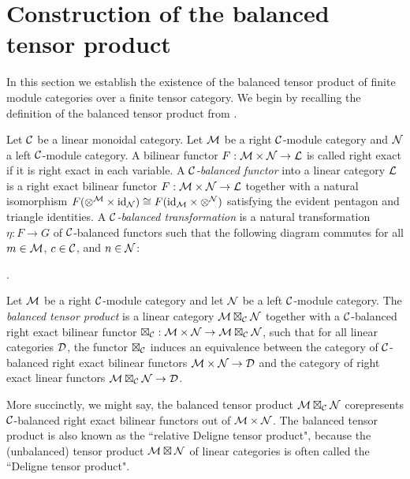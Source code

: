 \documentclass{amsart}
\begin{document}
\section{Construction of the balanced tensor product} \label{sec:tc-deligne}

In this section we establish the existence of the balanced tensor product of finite module categories over a finite tensor category.  We begin by recalling the definition of the balanced tensor product from \cite{0909.3140}.

\begin{definition} 
	Let $\mathcal C$ be a linear monoidal category. 
	Let $\mathcal M$ be a right $\mathcal C$-module category and $\mathcal N$ a left $\mathcal C$-module category.  A bilinear functor $F: \mathcal M \times \mathcal N \to \mathcal L$ is called right exact if it is right exact in each variable.   A {\em $\mathcal C$-balanced functor} into a linear category $\mathcal L$ is a right exact bilinear functor $F: \mathcal M \times \mathcal N \to \mathcal L$ together with a natural isomorphism $F(\otimes^{\mathcal M} \times \mathrm{id}_{\mathcal N}) \cong F(\mathrm{id}_{\mathcal M} \times \otimes^{\mathcal N})$ satisfying the evident pentagon and triangle identities.
	A {\em $\mathcal C$-balanced transformation} is a natural transformation $\eta:F \to G$ of $\mathcal C$-balanced functors such that the following diagram commutes for all $m \in \mathcal M$, $c \in \mathcal C$, and $n \in \mathcal N$:
\begin{center}
.
\end{center}
\end{definition}

\begin{definition}
	Let $\mathcal M$ be a right $\mathcal C$-module category and let $\mathcal N$ be a left $\mathcal C$-module category. The {\em balanced tensor product} is a linear category $\mathcal M \boxtimes_{\mathcal C} \mathcal N$
	 together with a $\mathcal C$-balanced right exact bilinear functor $\boxtimes_{\mathcal C} : \mathcal M \times \mathcal N \to \mathcal M \boxtimes_{\mathcal C} \mathcal N$, such that for all linear categories $\mathcal D$, the functor $\boxtimes_{\mathcal C}$ induces an equivalence between the category of $\mathcal C$-balanced right exact bilinear functors $\mathcal M \times \mathcal N \to \mathcal D$ and the category of right exact linear functors $\mathcal M \boxtimes_{\mathcal C} \mathcal N \to \mathcal D$.
\end{definition}
\nid More succinctly, we might say, the balanced tensor product $\mathcal M \boxtimes_{\mathcal C} \mathcal N$ corepresents $\mathcal C$-balanced right exact bilinear functors out of $\mathcal M \times \mathcal N$.  The balanced tensor product is also known as the ``relative Deligne tensor product", because the (unbalanced) tensor product $\mathcal M \boxtimes \mathcal N$ of linear categories is often called the ``Deligne tensor product".  
\end{document}
